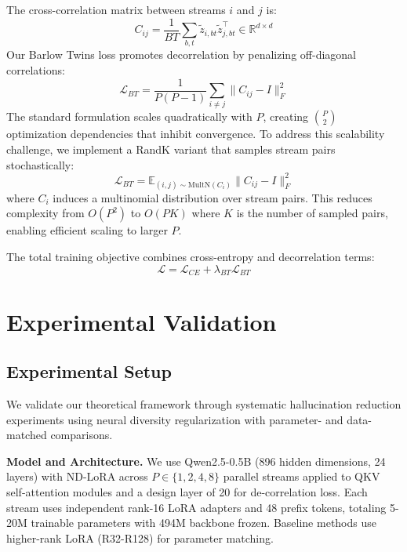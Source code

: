 \documentclass{article} %
\begin{document}
The cross-correlation matrix between streams $i$ and $j$ is:
\begin{equation}
  C_{ij} = \frac{1}{BT} \sum_{b,t} \tilde{z}_{i,bt} \tilde{z}_{j,bt}^\top \in \mathbb{R}^{d \times d}
\end{equation}
Our Barlow Twins loss promotes decorrelation by penalizing off-diagonal correlations:
\begin{equation}
  \mathcal{L}_{BT} = \frac{1}{P(P-1)} \sum_{i \neq j} \|C_{ij} - I\|_F^2
\end{equation}
The standard formulation scales quadratically with $P$, creating $\binom{P}{2}$ optimization dependencies
that inhibit convergence. To address this scalability challenge, we implement a RandK variant that
samples stream pairs stochastically:
\begin{equation}
  \mathcal{L}_{BT} = \mathbb{E}_{(i,j) \sim \text{MultN}(C_i)} \|C_{ij} - I\|_F^2
\end{equation}
where $C_i$ induces a multinomial distribution over stream pairs. This reduces complexity from $O(P^2)$ to
$O(PK)$ where $K$ is the number of sampled pairs, enabling efficient scaling to larger $P$.

The total training objective combines cross-entropy and decorrelation terms:
\begin{equation}
  \mathcal{L} = \mathcal{L}_{CE} + \lambda_{BT} \mathcal{L}_{BT}
\end{equation}

\section{Experimental Validation}
\subsection{Experimental Setup}
We validate our theoretical framework through systematic hallucination reduction experiments using neural
diversity regularization with parameter- and data-matched comparisons.

\textbf{Model and Architecture.} We use Qwen2.5-0.5B (896 hidden dimensions, 24 layers) with ND-LoRA
across $P \in \{1, 2, 4, 8\}$ parallel streams applied to QKV self-attention modules and a design layer of
20 for de-correlation loss. Each stream uses independent rank-16 LoRA adapters and 48 prefix tokens, totaling
5-20M trainable parameters with 494M backbone frozen. Baseline methods use higher-rank LoRA (R32-R128) for
parameter matching.
\end{document}
